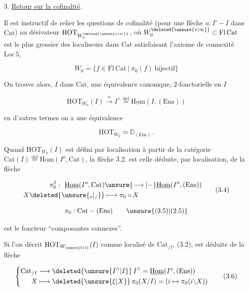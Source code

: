 
3. \uline{Retour sur la cofinalité}.

Il est instructif de relier les questions de cofinalité (pour une flèche $u:I'\mathbin{-}I$ dans $\mathrm{Cat}$) au dérivateur $\mathrm{HOT}_{W^{\deleted{\unsure{*|\infty}}}_0}$, où $W^{\deleted{\unsure{*|\infty}}}_0\subset\mathrm{Fl}\,\mathrm{Cat}$ est le plus grossier des localiseurs dans $\mathrm{Cat}$ satisfaisant l'axiome de connexité $\mathrm{Loc}\,5$,


\[
W_0=\bigl\{f\in\mathrm{Fl}\,\mathrm{Cat}\ \big|\ \pi_0(f)\ \text{bijectif}\bigr\}\tag*{(3.1.)}
\]

On trouve alors,  $I$ dans $\mathrm{Cat}$, une équivalence canonique, $2$-fonctorielle en $I$

\[
\mathrm{HOT}_{W_0}(I)\xrightarrow{\approx}I^\wedge\overset{\mathrm{def}}{=}\underline{\mathrm{Hom}}(I,(\mathrm{Ens}))\tag*{(3.2.)}
\]

en d'autres termes on a une équivalence

\[
\mathrm{HOT}_{W_0}\simeq\mathbb D_{(\mathrm{Ens})}\,.\tag*{(3.3.)}
\]

Quand $\mathrm{HOT}_{W_0}(I)$ est défini par localisation à partir de la catégorie $\mathrm{Cat}(I)\overset{\mathrm{def}}{=}\underline{\mathrm{Hom}}(I^o,\mathrm{Cat})$, la flèche 3.2. est celle déduite, par localisation, de la flèche

\[
\begin{aligned}
\pi_0^I:\ \underline{\mathrm{Hom}}(I^o,\mathrm{Cat})&\unsure{\longrightarrow|\mathbin{-}}\underline{\mathrm{Hom}}(I^o,(\mathrm{Ens}))\\
X\deleted{\unsure{_{*}|_{/}}}&\longmapsto\pi_0\circ X
\end{aligned}\tag*{(3.4)}
\]

\deleted{\unsure{$\pi$}}

\[
\pi_0:\mathrm{Cat}\mathbin{-}(\mathrm{Ens})\tag*{\unsure{(3.5)|(2.5)}}
\]

est le foncteur ``composantes connexes''.

Si l'on décrit $\mathrm{HOT}_{W_{\unsure{0|1}}}(I)$ comme localisé de $\mathrm{Cat}_{/I}$, (3.2), est déduite de la flèche

\[
\left\{\begin{aligned}
\mathrm{Cat}_{/I}&\longrightarrow\deleted{\unsure{I^\wedge|I}}\,I^\wedge=\underline{\mathrm{Hom}}(I^o,(\mathrm{Ens}))\\
X&\longmapsto\deleted{\unsure{\xi|X}}\,\pi_0(X/I)=(i\mapsto\pi_0(i\backslash X))\end{aligned}\right.\tag*{(3.6)}
\]

